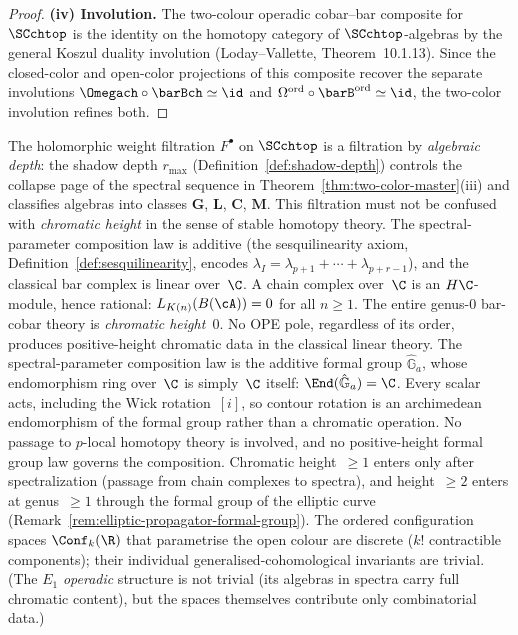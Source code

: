 \begin{proof}
\medskip
\noindent\textbf{(iv) Involution.}
The two-colour operadic cobar--bar composite
for~$\SCchtop$ is the identity on
the homotopy category of $\SCchtop$-algebras by the general
Koszul duality involution (Loday--Vallette, Theorem~10.1.13).
Since the closed-color and open-color projections of this
composite recover the separate involutions $\Omegach \circ
\barBch \simeq \id$ and
$\Omega^{\mathrm{ord}} \circ \barB^{\mathrm{ord}} \simeq
\id$, the two-color involution refines both.
\end{proof}

\begin{warning}%
\label{warn:pole-order-chromatic}%
%
The holomorphic weight filtration $F^\bullet$ on $\SCchtop$
is a filtration by \emph{algebraic depth}: the shadow depth
$r_{\max}$ (Definition~\ref{def:shadow-depth}) controls
the collapse page of the spectral sequence in
Theorem~\ref{thm:two-color-master}(iii) and classifies
algebras into classes $\mathbf{G}$, $\mathbf{L}$,
$\mathbf{C}$, $\mathbf{M}$. This filtration must not be
confused with \emph{chromatic height} in the sense of
stable homotopy theory. The spectral-parameter composition
law is additive (the sesquilinearity axiom,
Definition~\ref{def:sesquilinearity}, encodes
$\lambda_I = \lambda_{p+1} + \cdots + \lambda_{p+r-1}$),
and the classical bar complex is linear over~$\C$.
A chain complex over~$\C$ is an $H\C$-module, hence
rational: $L_{K(n)}(B(\cA)) = 0$ for all $n \ge 1$.
The entire genus-$0$ bar-cobar theory is
\emph{chromatic height~$0$}. No OPE pole, regardless of
its order, produces positive-height chromatic data in the
classical linear theory.
The spectral-parameter composition law is the
additive formal group $\hat{\mathbb{G}}_a$, whose
endomorphism ring over~$\C$ is simply~$\C$ itself:
$\End(\hat{\mathbb{G}}_a) = \C$. Every scalar acts,
including the Wick rotation~$[i]$, so contour rotation
is an archimedean endomorphism of the formal group rather
than a chromatic operation. No passage to $p$-local
homotopy theory is involved, and no positive-height formal
group law governs the composition.
Chromatic height~$\ge 1$ enters
only after spectralization (passage from chain complexes to
spectra), and height~$\ge 2$ enters at genus~$\ge 1$
through the formal group of the elliptic curve
(Remark~\ref{rem:elliptic-propagator-formal-group}).
The ordered configuration spaces $\Conf_k(\R)$ that
parametrise the open colour are discrete ($k!$ contractible
components); their individual generalised-cohomological
invariants are trivial. (The $E_1$ \emph{operadic}
structure is not trivial (its algebras in spectra carry
full chromatic content), but the spaces themselves
contribute only combinatorial data.)
\end{warning}

